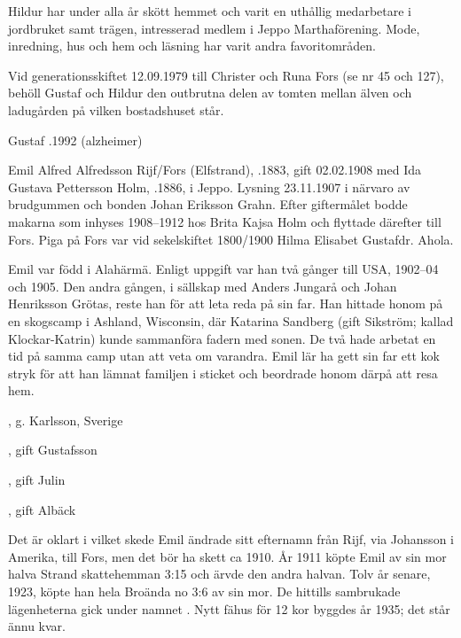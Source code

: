 Hildur har under alla år skött hemmet och varit en uthållig medarbetare i jordbruket samt trägen, intresserad medlem i Jeppo Marthaförening. Mode, inredning, hus och hem och läsning har varit andra favoritområden.

Vid generationsskiftet 12.09.1979 till Christer och Runa Fors (se nr 45 och 127), behöll Gustaf och Hildur den outbrutna delen av tomten mellan älven och ladugården på vilken bostadshuset står.

Gustaf .1992 (alzheimer)



Emil Alfred Alfredsson Rijf/Fors (Elfstrand), .1883, gift 02.02.1908 med Ida Gustava Pettersson Holm, .1886, i Jeppo. Lysning 23.11.1907 i närvaro av brudgummen och bonden Johan Eriksson Grahn. Efter giftermålet bodde makarna som inhyses 1908--1912 hos Brita Kajsa Holm och flyttade därefter till Fors. Piga på Fors var vid sekelskiftet 1800/1900 Hilma Elisabet Gustafdr. Ahola.

Emil var född i Alahärmä. Enligt uppgift var han två gånger till USA, 1902--04 och 1905. Den andra gången, i sällskap med Anders Jungarå och Johan Henriksson Grötas, reste han för att leta reda på sin far. Han hittade honom på en skogscamp i Ashland, Wisconsin, där Katarina Sandberg (gift Sikström; kallad Klockar-Katrin) kunde sammanföra fadern med	sonen. De två hade arbetat en tid på samma camp utan att veta om varandra. Emil lär ha gett sin far ett kok stryk för att han lämnat familjen i sticket och beordrade honom därpå att resa hem.
\begin{jhchildren}
  \item {}, g. Karlsson, Sverige
  \item {}, gift Gustafsson
  \item {}, gift Julin
  \item {}
  \item {}, gift Albäck
\end{jhchildren}
Det är oklart i vilket skede Emil ändrade sitt efternamn från Rijf, via Johansson i Amerika, till Fors, men det bör ha skett ca 1910. År 1911 köpte Emil av sin mor halva Strand skattehemman 3:15 och ärvde den andra halvan. Tolv år senare, 1923, köpte han hela Broända no 3:6 av sin mor. De hittills sambrukade lägenheterna gick under namnet . Nytt fähus för 12 kor byggdes år 1935; det står ännu kvar.

